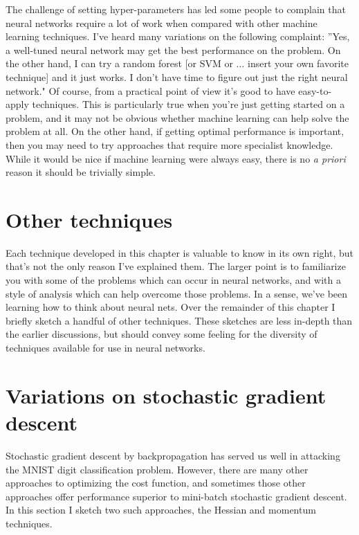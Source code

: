 The challenge of setting hyper-parameters has led some people to complain that neural networks require a lot of work when compared with other machine learning techniques. I've heard many variations on the following complaint: ''Yes, a well-tuned neural network may get the best performance on the problem. On the other hand, I can try a random forest [or SVM or $\ldots$
insert your own favorite technique] and it just works. I don't have time to figure out just the right neural network." Of course, from a practical point of view it's good to have easy-to-apply techniques. This is particularly true when you're just getting started on a problem, and it may not be obvious whether machine learning can help solve the problem at all. On the other hand, if getting optimal performance is important, then you may need to try approaches that require more specialist knowledge. While it would be nice if machine learning were always easy, there is no \textit{a priori} reason it should be trivially simple.




\section{Other techniques}


Each technique developed in this chapter is valuable to know in its own right, but that's not the only reason I've explained them. The larger point is to familiarize you with some of the problems which can occur in neural networks, and with a style of analysis which can help overcome those problems. In a sense, we've been learning how to think about neural nets. Over the remainder of this chapter I briefly sketch a handful of other techniques. These sketches are less in-depth than the earlier discussions, but should convey some feeling for the diversity of techniques available for use in neural networks.

\section{Variations on stochastic gradient descent}
\label{sec:Variationsonstochasticgradientdescent}
Stochastic gradient descent by backpropagation has served us well in attacking the MNIST digit classification problem. However, there are many other approaches to optimizing the cost function, and sometimes those other approaches offer performance superior to mini-batch stochastic gradient descent. In this section I sketch two such approaches, the Hessian and momentum techniques.


